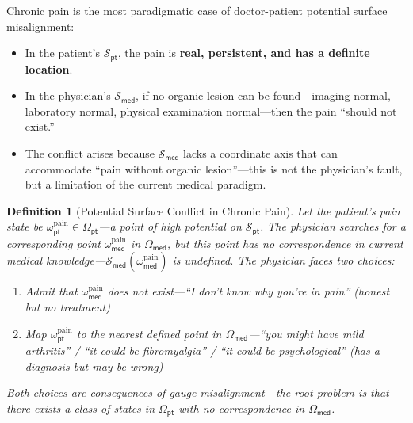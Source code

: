 \documentclass[12pt,a4paper]{article}
\newtheorem{definition}[theorem]{Definition}
\theoremstyle{remark}
\newcommand{\med}{\textsf{med}}
\newcommand{\pt}{\textsf{pt}}
\begin{document}
Chronic pain is the most paradigmatic case of doctor-patient potential surface misalignment:

\begin{itemize}
    \item In the patient's $\mathcal{S}_{\pt}$, the pain is \textbf{real, persistent, and has a definite location}.
    \item In the physician's $\mathcal{S}_{\med}$, if no organic lesion can be found---imaging normal, laboratory normal, physical examination normal---then the pain ``should not exist.''
    \item The conflict arises because $\mathcal{S}_{\med}$ lacks a coordinate axis that can accommodate ``pain without organic lesion''---this is not the physician's fault, but a limitation of the current medical paradigm.
\end{itemize}

\begin{definition}[Potential Surface Conflict in Chronic Pain]\label{def:chronic_pain}
Let the patient's pain state be $\omega_{\pt}^{\text{pain}} \in \Omega_{\pt}$---a point of high potential on $\mathcal{S}_{\pt}$. The physician searches for a corresponding point $\omega_{\med}^{\text{pain}}$ in $\Omega_{\med}$, but this point has no correspondence in current medical knowledge---$\mathcal{S}_{\med}(\omega_{\med}^{\text{pain}})$ is undefined. The physician faces two choices:
\begin{enumerate}[label=(\roman*)]
    \item Admit that $\omega_{\med}^{\text{pain}}$ does not exist---``I don't know why you're in pain'' (honest but no treatment)
    \item Map $\omega_{\pt}^{\text{pain}}$ to the nearest defined point in $\Omega_{\med}$---``you might have mild arthritis'' / ``it could be fibromyalgia'' / ``it could be psychological'' (has a diagnosis but may be wrong)
\end{enumerate}
Both choices are consequences of gauge misalignment---the root problem is that there exists a class of states in $\Omega_{\pt}$ with no correspondence in $\Omega_{\med}$.
\end{definition}
\end{document}
